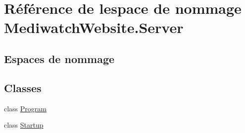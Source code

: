 \hypertarget{namespace_mediwatch_website_1_1_server}{}\section{Référence de l\textquotesingle{}espace de nommage Mediwatch\+Website.\+Server}
\label{namespace_mediwatch_website_1_1_server}
\subsection*{Espaces de nommage}
\begin{DoxyCompactItemize}
\end{DoxyCompactItemize}
\subsection*{Classes}
\begin{DoxyCompactItemize}
\item 
class \hyperlink{class_mediwatch_website_1_1_server_1_1_program}{Program}
\item 
class \hyperlink{class_mediwatch_website_1_1_server_1_1_startup}{Startup}
\end{DoxyCompactItemize}
